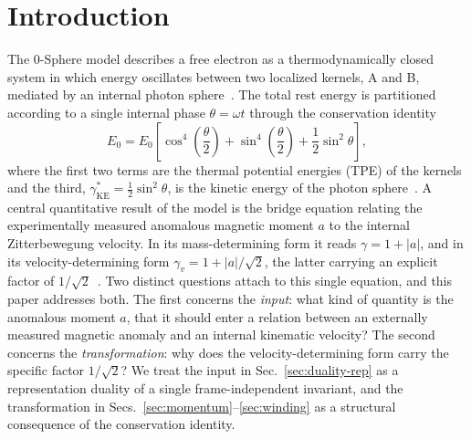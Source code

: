 \documentclass[%
 reprint, amsmath,amssymb, aps, prb, ]{revtex4-2}
\numberwithin{equation}{section}
\newcommand{\gKE}{\gamma^{*}_{\text{KE}}}
\begin{document}
\begin{abstract}
The result places the mass-determining peak factor and the velocity-determining RMS factor on a common footing as two readings of the same $\sin^2\theta$ partition, and establishes that the factor $1/\sqrt{2}$ is intrinsic to the identity rather than imported.
The placement of the factor is stated with the same discipline applied to the input: the ratio derived here is a velocity-level ratio, whereas the canonical form $\gamma_v = 1 + \lvert a\rvert/\sqrt{2}$ places the factor at the level of $a$; because the bridge relation is nonlinear, the two placements differ by a residual factor of $2^{1/4}$ at the velocity level, and their exact reconciliation is recorded as an open task rather than asserted.
An appendix records the line-integral genealogy of the construction and the inverse-direction use of geometry across the model.
\end{abstract}

\maketitle

\section{Introduction}
\label{sec:intro}

The 0-Sphere model describes a free electron as a thermodynamically closed system in which energy oscillates between two localized kernels, A and B, mediated by an internal photon sphere~\cite{hanamura01}. The total rest energy is partitioned according to a single internal phase $\theta=\omega t$ through the conservation identity
\begin{equation}
E_0 = E_0\!\left[\cos^4\!\left(\frac{\theta}{2}\right) + \sin^4\!\left(\frac{\theta}{2}\right) + \frac{1}{2}\sin^2\theta\right],
\label{eq:identity}
\end{equation}
where the first two terms are the thermal potential energies (TPE) of the kernels and the third, $\gKE=\tfrac{1}{2}\sin^2\theta$, is the kinetic energy of the photon sphere~\cite{hanamura01}. A central quantitative result of the model is the bridge equation relating the experimentally measured anomalous magnetic moment $a$ to the internal Zitterbewegung velocity. In its mass-determining form it reads $\gamma = 1 + \lvert a\rvert$, and in its velocity-determining form $\gamma_v = 1 + \lvert a\rvert/\sqrt{2}$, the latter carrying an explicit factor of $1/\sqrt{2}$~\cite{hanamura10,hanamura61}. Two distinct questions attach to this single equation, and this paper addresses both. The first concerns the \emph{input}: what kind of quantity is the anomalous moment $a$, that it should enter a relation between an externally measured magnetic anomaly and an internal kinematic velocity? The second concerns the \emph{transformation}: why does the velocity-determining form carry the specific factor $1/\sqrt{2}$? We treat the input in Sec.~\ref{sec:duality-rep} as a representation duality of a single frame-independent invariant, and the transformation in Secs.~\ref{sec:momentum}--\ref{sec:winding} as a structural consequence of the conservation identity.
\end{document}
